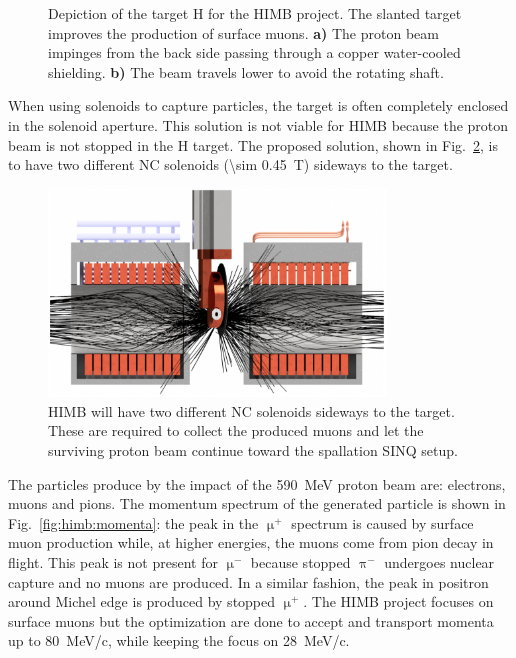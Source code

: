 \begin{refsection}
\begin{figure}
{            \label{fig:himb:target:b}}
            \caption[HIMB: H target]{Depiction of the target H for the HIMB project. The slanted target improves the production of surface muons. \textbf{a)} The proton beam impinges from the back side passing through a copper water-cooled shielding. \textbf{b)} The beam travels lower to avoid the rotating shaft.}
            \label{fig:himb:target}
        \end{figure}
        
        \noindent
        When using solenoids to capture particles, the target is often completely enclosed in the solenoid aperture. 
        This solution is not viable for HIMB because the proton beam is not stopped in the H target. 
        The proposed solution, shown in Fig.~\ref{fig:himb:solenoids}, is to have two different NC solenoids (\SI{\sim 0.45}{T}) sideways to the target. 

        \begin{figure}[h]
            \centering
            \includegraphics[width=0.8\textwidth]{Figures/Introduction/himb_solenoids.png}
            \caption[HIMB: collection solenoids]{HIMB will have two different NC solenoids sideways to the target. These are required to collect the produced muons and let the surviving proton beam continue toward the spallation SINQ setup.}
            \label{fig:himb:solenoids}
        \end{figure}

        \noindent
        The particles produce by the impact of the \SI{590}{MeV} proton beam are: electrons, muons and pions.
        The momentum spectrum of the generated particle is shown in Fig.~\ref{fig:himb:momenta}: the peak in the $\upmu^+$ spectrum is caused by surface muon production while, at higher energies, the muons come from pion decay in flight. 
        This peak is not present for $\upmu^-$ because stopped $\uppi^-$ undergoes nuclear capture and no muons are produced.  
        In a similar fashion, the peak in positron around Michel edge is produced by stopped $\upmu^+$.
        The HIMB project focuses on surface muons but the optimization are done to accept and transport momenta up to \SI{80}{MeV/c}, while keeping the focus on \SI{28}{MeV/c}.
        

\end{refsection}
